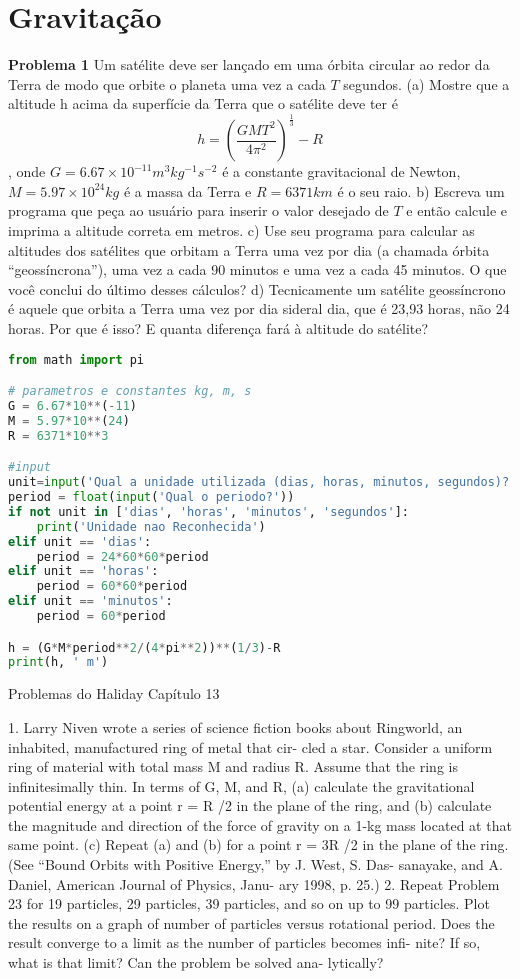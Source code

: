 \chapter{Gravitação}

{\bf Problema 1} Um satélite deve ser lançado em uma órbita circular ao redor da Terra de modo que orbite o planeta uma vez a cada $T$ segundos.
(a) Mostre que a altitude h acima da superfície da Terra que o satélite deve ter é
$$h = \left( \frac{GMT^2}{4\pi^2}\right)^{\frac{1}{3}} - R$$,
onde $G = 6.67 \times 10^{-11} m^3 kg^{-1}s^{-2}$ é a constante gravitacional de Newton, $M = 5.97 \times 10^{24} kg$ é a massa da Terra e $R = 6371 km$ é o seu raio.
b) Escreva um programa que peça ao usuário para inserir o valor desejado de $T$ e então calcule e imprima a altitude correta em metros.
c) Use seu programa para calcular as altitudes dos satélites que orbitam a Terra uma vez
por dia (a chamada órbita ``geossíncrona''), uma vez a cada 90 minutos e uma vez a cada
45 minutos. O que você conclui do último desses cálculos?
d) Tecnicamente um satélite geossíncrono é aquele que orbita a Terra uma vez por dia sideral dia, que é 23,93 horas, não 24 horas. Por que é isso? E quanta diferença
fará à altitude do satélite?

\begin{lstlisting}[language=Python, frame=lines,basicstyle=\footnotesize, caption={Altitude de um Satélite}, label={lst:Satelite}]
from math import pi

# parametros e constantes kg, m, s
G = 6.67*10**(-11) 
M = 5.97*10**(24) 
R = 6371*10**3

#input
unit=input('Qual a unidade utilizada (dias, horas, minutos, segundos)?')
period = float(input('Qual o periodo?'))
if not unit in ['dias', 'horas', 'minutos', 'segundos']:
    print('Unidade nao Reconhecida')
elif unit == 'dias':
    period = 24*60*60*period
elif unit == 'horas':
    period = 60*60*period
elif unit == 'minutos':
    period = 60*period

h = (G*M*period**2/(4*pi**2))**(1/3)-R
print(h, ' m')
\end{lstlisting}

Problemas do Haliday Capítulo 13

1. Larry Niven wrote a series of science fiction books about
Ringworld, an inhabited, manufactured ring of metal that cir-
cled a star. Consider a uniform ring of material with total
mass M and radius R. Assume that the ring is infinitesimally
thin. In terms of G, M, and R, (a) calculate the gravitational
potential energy at a point r = R /2 in the plane of the ring,
and (b) calculate the magnitude and direction of the force of
gravity on a 1-kg mass located at that same point. (c) Repeat
(a) and (b) for a point r = 3R /2 in the plane of the ring. (See
“Bound Orbits with Positive Energy,” by J. West, S. Das-
sanayake, and A. Daniel, American Journal of Physics, Janu-
ary 1998, p. 25.)
2. Repeat Problem 23 for 19 particles, 29 particles, 39 particles,
and so on up to 99 particles. Plot the results on a graph of
number of particles versus rotational period. Does the result
converge to a limit as the number of particles becomes infi-
nite? If so, what is that limit? Can the problem be solved ana-
lytically?

